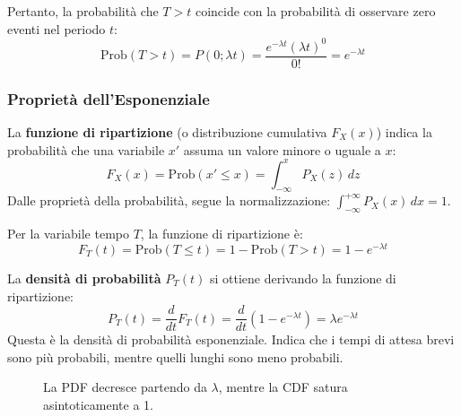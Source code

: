 \documentclass[openany,a4paper,12pt]{book}
\theoremstyle{remark}
\begin{document}
Pertanto, la probabilità che $T > t$ coincide con la probabilità di osservare zero eventi nel periodo $t$:
\begin{equation}
    \text{Prob}(T > t) = P(0; \lambda t) = \frac{e^{-\lambda t} (\lambda t)^0}{0!} = e^{-\lambda t}
\end{equation}


\subsubsection*{Proprietà dell'Esponenziale}
La \textbf{funzione di ripartizione} (o distribuzione cumulativa $F_X(x)$) indica la probabilità che una variabile $x'$ assuma un valore minore o uguale a $x$:
\begin{equation}
    F_X(x) = \text{Prob}(x' \le x) = \int_{-\infty}^{x} P_X(z) \, dz
\end{equation}
Dalle proprietà della probabilità, segue la normalizzazione: $\int_{-\infty}^{+\infty} P_X(x) \, dx = 1$.

Per la variabile tempo $T$, la funzione di ripartizione è:
\begin{equation}
    F_T(t) = \text{Prob}(T \le t) = 1 - \text{Prob}(T > t) = 1 - e^{-\lambda t}
\end{equation}

La \textbf{densità di probabilità} $P_T(t)$ si ottiene derivando la funzione di ripartizione:
\begin{equation}
    P_T(t) = \frac{d}{dt} F_T(t) = \frac{d}{dt} (1 - e^{-\lambda t}) = \lambda e^{-\lambda t}
\end{equation}
Questa è la densità di probabilità esponenziale. Indica che i tempi di attesa brevi sono più probabili, mentre quelli lunghi sono meno probabili.


\begin{figure}[ht!]
    \centering
    \caption{La PDF decresce partendo da $\lambda$, mentre la CDF satura asintoticamente a 1.}
\end{figure}
\end{document}
